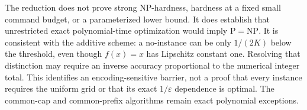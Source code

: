 The reduction does not prove strong NP-hardness, hardness at a fixed small command budget, or a parameterized lower bound. It does establish that unrestricted exact polynomial-time optimization would imply $\mathrm P=\mathrm{NP}$. It is consistent with the additive scheme: a no-instance can be only $1/(2K)$ below the threshold, even though $f(x)=x$ has Lipschitz constant one. Resolving that distinction may require an inverse accuracy proportional to the numerical integer total. This identifies an encoding-sensitive barrier, not a proof that every instance requires the uniform grid or that its exact $1/\varepsilon$ dependence is optimal. The common-cap and common-prefix algorithms remain exact polynomial exceptions.
